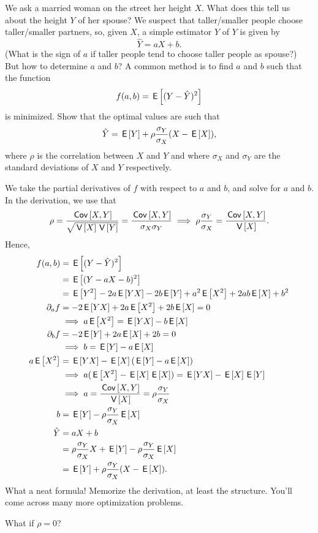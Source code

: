 \documentclass[lectures]{subfiles}
\begin{document}
\begin{exercise}
We ask a married woman on the street her height $X$.
What does this tell us about the height $Y$ of her spouse?
We suspect that taller/smaller people choose taller/smaller partners, so, given $X$, a simple estimator $\hat Y$ of $Y$ is given by
\begin{equation*}
  \hat Y = a X + b.
\end{equation*}
(What is the sign of $a$ if taller people tend to choose taller people as spouse?)
But how to determine $a$ and $b$? A common method is to find $a$ and $b$ such that the function
\begin{equation*}
  f(a,b) = \,\mathsf{E}\left[(Y-\hat Y)^2\right]
\end{equation*}
is minimized. Show that the optimal values are such that
\begin{align*}
  \hat Y = \,\mathsf{E}\left[Y\right] + \rho \frac{\sigma_Y}{\sigma_X} (X - \,\mathsf{E}\left[X\right]),
\end{align*}
where $\rho$ is the correlation between $X$ and $Y$ and where $\sigma_X$ and $\sigma_Y$ are the standard deviations of $X$ and $Y$ respectively.

\begin{solution}
We take the partial derivatives of $f$ with respect to $a$ and $b$, and solve for $a$ and $b$. In the derivation, we use that
\begin{align}
  \label{eq:336}
\rho = \frac{\,\mathsf{Cov}\left[X,Y\right]}{\sqrt{\,\mathsf{V}\left[X\right] \,\mathsf{V}\left[Y\right]}} = \frac{\,\mathsf{Cov}\left[X,Y\right]}{\sigma_X \sigma_Y} \implies  \rho \frac{\sigma_{Y}}{\sigma_{X}} = \frac{\,\mathsf{Cov}\left[X,Y\right]}{\,\mathsf{V}\left[X\right]}.
\end{align}
Hence,
  \begin{align*}
f(a,b) &= \,\mathsf{E}\left[(Y-\hat Y)^2\right] \\
 &= \,\mathsf{E}\left[(Y-a X - b)^2\right] \\
 &= \,\mathsf{E}\left[Y^{2}\right] - 2a\,\mathsf{E}\left[YX\right] - 2b\,\mathsf{E}\left[Y\right] + a^{2}\,\mathsf{E}\left[X^2\right] + 2 ab \,\mathsf{E}\left[X\right] + b^{2}\\
\partial_{a} f &=-2 \,\mathsf{E}\left[YX\right] + 2a \,\mathsf{E}\left[X^2\right] + 2 b \,\mathsf{E}\left[X\right] = 0 \\
&\implies a \,\mathsf{E}\left[X^2\right] =  \,\mathsf{E}\left[YX\right]  -  b \,\mathsf{E}\left[X\right] \\
\partial_{b} f &=-2 \,\mathsf{E}\left[Y\right]  + 2 a \,\mathsf{E}\left[X\right]  + 2 b= 0 \\
& \implies  b = \,\mathsf{E}\left[Y\right] - a \,\mathsf{E}\left[X\right]\\
a \,\mathsf{E}\left[X^2\right] &=  \,\mathsf{E}\left[YX\right]  -  \,\mathsf{E}\left[X\right] (\,\mathsf{E}\left[Y\right] - a \,\mathsf{E}\left[X\right]) \\
&\implies  a (\,\mathsf{E}\left[X^{2}\right] - \,\mathsf{E}\left[X\right] \,\mathsf{E}\left[X\right])  = \,\mathsf{E}\left[YX\right] - \,\mathsf{E}\left[X\right] \,\mathsf{E}\left[Y\right]  \\
&\implies a = \frac{\,\mathsf{Cov}\left[X,Y\right]}{\,\mathsf{V}\left[X\right]} = \rho \frac{\sigma_Y}{\sigma_X}\\
b &= \,\mathsf{E}\left[Y\right] - \rho \frac{\sigma_Y}{\sigma_X}\,\mathsf{E}\left[X\right]\\
\hat Y &= a X + b \\
&= \rho \frac{\sigma_Y}{\sigma_X} X + \,\mathsf{E}\left[Y\right] - \rho\frac{\sigma_Y}{\sigma_X} \,\mathsf{E}\left[X\right] \\
&=  \,\mathsf{E}\left[Y\right] + \rho \frac{\sigma_Y}{\sigma_X} (X-\,\mathsf{E}\left[X\right]).
  \end{align*}
What a neat formula! Memorize the derivation, at least the structure. You'll come across many more optimization problems.

What if $\rho=0$?
\end{solution}
\end{exercise}
\end{document}
